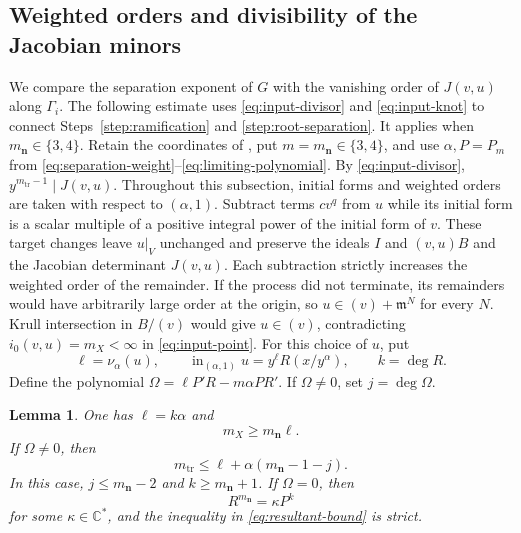 \documentclass[11pt,letterpaper]{article}
\numberwithin{equation}{section}
\newtheorem{lemma}[lemma]{Lemma}
\theoremstyle{remark}
\theoremstyle{plain}
\newcommand{\C}{\mathbb{C}}
\begin{document}
\subsection{Weighted orders and divisibility of the Jacobian minors}
\label{sec:weighted-pair}

We compare the separation exponent of $G$ with the vanishing order
of $J(v,u)$ along $\Gamma_i$.  The following estimate uses
\eqref{eq:input-divisor} and \eqref{eq:input-knot} to connect
Steps~\ref{step:ramification} and \ref{step:root-separation}.
It applies when $m_{\boldsymbol n}\in\{3,4\}$.
Retain the coordinates of , put
$m=m_{\boldsymbol n}\in\{3,4\}$, and use $\alpha,P=P_m$ from
\eqref{eq:separation-weight}--\eqref{eq:limiting-polynomial}.
By \eqref{eq:input-divisor}, $y^{m_{\mathrm{tr}}-1}\mid J(v,u)$.
Throughout this subsection, initial forms and weighted orders are
taken with respect to $(\alpha,1)$.
Subtract terms $cv^q$ from $u$ while its initial form is a scalar
multiple of a positive integral power of the initial form of $v$.
These target changes leave $u|_V$ unchanged and preserve the ideals
$I$ and $(v,u)B$ and the Jacobian determinant $J(v,u)$.
Each subtraction strictly increases the weighted order of the remainder.
If the process did not terminate, its remainders would have
arbitrarily large order at the origin, so $u\in(v)+\mathfrak m^N$
for every $N$.  Krull intersection in $B/(v)$
\cite[Theorem~B.4.2]{GreuelLossenShustin} would give $u\in(v)$,
contradicting $i_0(v,u)=m_X<\infty$ in \eqref{eq:input-point}.
For this choice of $u$, put
\[
 \ell=\nu_\alpha(u),\qquad
 \operatorname{in}_{(\alpha,1)}u=y^\ell R(x/y^\alpha),\qquad
 k=\deg R.
\]
Define the polynomial $\Omega=\ell P'R-m\alpha PR'$.
If $\Omega\neq0$, set $j=\deg\Omega$.

\begin{lemma}
\label{lem:weighted-pair}
One has $\ell=k\alpha$ and
\begin{equation}
 m_X\geq m_{\boldsymbol{n}}\ell.                      \label{eq:resultant-bound}
\end{equation}
If $\Omega\neq0$, then
\begin{equation}
 m_{\mathrm{tr}}
 \leq\ell+\alpha(m_{\boldsymbol{n}}-1-j).              \label{eq:jacobian-bound}
\end{equation}
In this case, $j\leq m_{\boldsymbol n}-2$ and
$k\geq m_{\boldsymbol n}+1$.  If $\Omega=0$, then
\begin{equation}
 R^{m_{\boldsymbol{n}}}=\kappa P^k                    \label{eq:power-identity}
\end{equation}
for some $\kappa\in\C^*$, and the inequality in
\eqref{eq:resultant-bound} is strict.
\end{lemma}
\end{document}
